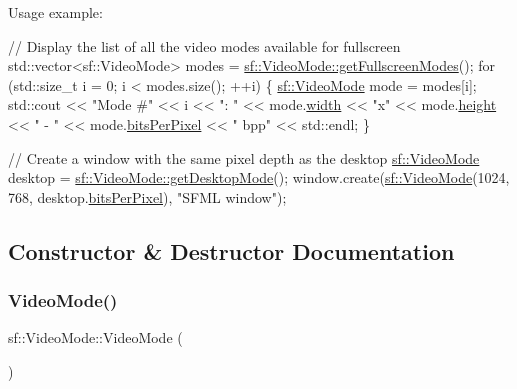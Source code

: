 Usage example\+: 
\begin{DoxyCode}
\textcolor{comment}{// Display the list of all the video modes available for fullscreen}
std::vector<sf::VideoMode> modes = \hyperlink{classsf_1_1_video_mode_a6815b9b3b35767d5b4563fbed4bfc67b}{sf::VideoMode::getFullscreenModes}();
\textcolor{keywordflow}{for} (std::size\_t i = 0; i < modes.size(); ++i)
\{
    \hyperlink{classsf_1_1_video_mode}{sf::VideoMode} mode = modes[i];
    std::cout << \textcolor{stringliteral}{"Mode #"} << i << \textcolor{stringliteral}{": "}
              << mode.\hyperlink{classsf_1_1_video_mode_a9b3b2ad2cac6b9c266823fb5ed506d90}{width} << \textcolor{stringliteral}{"x"} << mode.\hyperlink{classsf_1_1_video_mode_a5a88d44c9470db7474361a42a189342d}{height} << \textcolor{stringliteral}{" - "}
              << mode.\hyperlink{classsf_1_1_video_mode_aa080f1ef96a1008d58b1920eceb189df}{bitsPerPixel} << \textcolor{stringliteral}{" bpp"} << std::endl;
\}

\textcolor{comment}{// Create a window with the same pixel depth as the desktop}
\hyperlink{classsf_1_1_video_mode}{sf::VideoMode} desktop = \hyperlink{classsf_1_1_video_mode_ac1be160a4342e6eafb2cb0e8c9b18d44}{sf::VideoMode::getDesktopMode}();
window.create(\hyperlink{classsf_1_1_video_mode}{sf::VideoMode}(1024, 768, desktop.\hyperlink{classsf_1_1_video_mode_aa080f1ef96a1008d58b1920eceb189df}{bitsPerPixel}), \textcolor{stringliteral}{"SFML window"});
\end{DoxyCode}
 

\subsection{Constructor \& Destructor Documentation}
\mbox{\label{classsf_1_1_video_mode_a04c9417e5c304510bef5f6aeb03f6ce1}} 
\subsubsection{\texorpdfstring{Video\+Mode()}{VideoMode()}\hspace{0.1cm}{\footnotesize\ttfamily [1/2]}}
{\footnotesize\ttfamily sf\+::\+Video\+Mode\+::\+Video\+Mode (\begin{DoxyParamCaption}{ }\end{DoxyParamCaption})}



